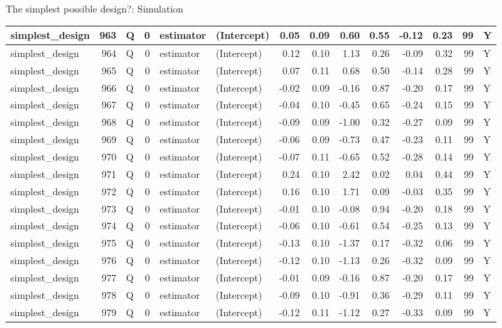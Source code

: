 \documentclass[
  11pt,
  ignorenonframetext,
]{beamer}
\begin{document}
\begin{frame}[fragile]{The simplest possible design?: Simulation}
\begin{tabular}{l|r|l|r|l|l|r|r|r|r|r|r|r|l}
\hline
simplest\_design & 963 & Q & 0 & estimator & (Intercept) & 0.05 & 0.09 & 0.60 & 0.55 & -0.12 & 0.23 & 99 & Y\\
\hline
simplest\_design & 964 & Q & 0 & estimator & (Intercept) & 0.12 & 0.10 & 1.13 & 0.26 & -0.09 & 0.32 & 99 & Y\\
\hline
simplest\_design & 965 & Q & 0 & estimator & (Intercept) & 0.07 & 0.11 & 0.68 & 0.50 & -0.14 & 0.28 & 99 & Y\\
\hline
simplest\_design & 966 & Q & 0 & estimator & (Intercept) & -0.02 & 0.09 & -0.16 & 0.87 & -0.20 & 0.17 & 99 & Y\\
\hline
simplest\_design & 967 & Q & 0 & estimator & (Intercept) & -0.04 & 0.10 & -0.45 & 0.65 & -0.24 & 0.15 & 99 & Y\\
\hline
simplest\_design & 968 & Q & 0 & estimator & (Intercept) & -0.09 & 0.09 & -1.00 & 0.32 & -0.27 & 0.09 & 99 & Y\\
\hline
simplest\_design & 969 & Q & 0 & estimator & (Intercept) & -0.06 & 0.09 & -0.73 & 0.47 & -0.23 & 0.11 & 99 & Y\\
\hline
simplest\_design & 970 & Q & 0 & estimator & (Intercept) & -0.07 & 0.11 & -0.65 & 0.52 & -0.28 & 0.14 & 99 & Y\\
\hline
simplest\_design & 971 & Q & 0 & estimator & (Intercept) & 0.24 & 0.10 & 2.42 & 0.02 & 0.04 & 0.44 & 99 & Y\\
\hline
simplest\_design & 972 & Q & 0 & estimator & (Intercept) & 0.16 & 0.10 & 1.71 & 0.09 & -0.03 & 0.35 & 99 & Y\\
\hline
simplest\_design & 973 & Q & 0 & estimator & (Intercept) & -0.01 & 0.10 & -0.08 & 0.94 & -0.20 & 0.18 & 99 & Y\\
\hline
simplest\_design & 974 & Q & 0 & estimator & (Intercept) & -0.06 & 0.10 & -0.61 & 0.54 & -0.25 & 0.13 & 99 & Y\\
\hline
simplest\_design & 975 & Q & 0 & estimator & (Intercept) & -0.13 & 0.10 & -1.37 & 0.17 & -0.32 & 0.06 & 99 & Y\\
\hline
simplest\_design & 976 & Q & 0 & estimator & (Intercept) & -0.12 & 0.10 & -1.13 & 0.26 & -0.32 & 0.09 & 99 & Y\\
\hline
simplest\_design & 977 & Q & 0 & estimator & (Intercept) & -0.01 & 0.09 & -0.16 & 0.87 & -0.20 & 0.17 & 99 & Y\\
\hline
simplest\_design & 978 & Q & 0 & estimator & (Intercept) & -0.09 & 0.10 & -0.91 & 0.36 & -0.29 & 0.11 & 99 & Y\\
\hline
simplest\_design & 979 & Q & 0 & estimator & (Intercept) & -0.12 & 0.11 & -1.12 & 0.27 & -0.33 & 0.09 & 99 & Y\\

\end{tabular}
\end{frame}
\end{document}
